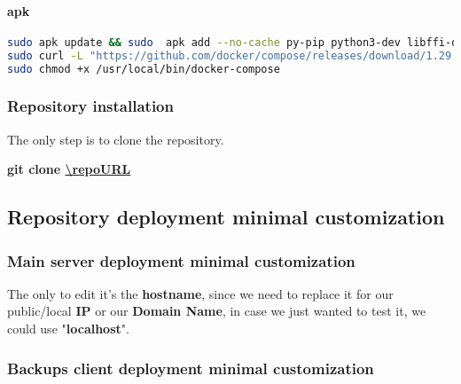 \paragraph{apk}
\begin{flushleft}
\begin{lstlisting}[language=bash,label={lst:apk-compose}]
sudo apk update && sudo  apk add --no-cache py-pip python3-dev libffi-dev openssl-dev gcc libc-dev rust cargo make
sudo curl -L "https://github.com/docker/compose/releases/download/1.29.2/docker-compose-$(uname -s)-$(uname -m)" -o /usr/local/bin/docker-compose
sudo chmod +x /usr/local/bin/docker-compose
\end{lstlisting}
\end{flushleft}


\subsubsection{Repository installation}\label{subsubsec:repo-installation}
\begin{flushleft}
    The only step is to clone the repository.
    \begin{flushleft}
        \textbf{git clone \url{\repoURL}}
    \end{flushleft}
\end{flushleft}




\subsection{Repository deployment minimal customization}\label{subsec:repo-customization}
\subsubsection[Main server deployment minimal customization]{Main server deployment minimal customization}

\begin{flushleft}
    The only to edit it's the \textbf{hostname}, since we need to replace it for our public/local \textbf{IP}
    or our \textbf{Domain Name}, in case we just wanted to test it, we could use "\textbf{localhost}".
\end{flushleft}

\newpage
\subsubsection[Backups client deployment minimal customization]{Backups client deployment minimal customization}
